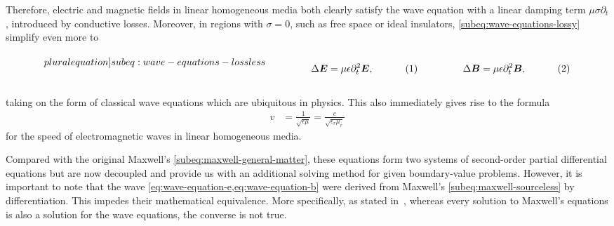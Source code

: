 \documentclass[11pt,a4paper,twoside,openany]{report}
\begin{document}
Therefore, electric and magnetic fields in linear homogeneous media both clearly satisfy the wave equation with a linear damping term $\mu\sigma\partial_t$, introduced by conductive losses. Moreover, in regions with $\sigma = 0$, such as free space or ideal insulators, \cref{subeq:wave-equations-lossy} simplify even more to\\
\begin{subequations}
    \label[pluralequation]{subeq:wave-equations-lossless}
    \noindent\centering
    \begin{minipage}{0.45\textwidth}
        \begin{align}
            \label{eq:wave-equation-e-lossless}
            \Delta\vec E &= \mu\epsilon\partial^2_t\vec E,
        \end{align}
    \end{minipage}
    \hfill
    \begin{minipage}{0.45\textwidth}
        \begin{align}
            \label{eq:wave-equations-b-lossless}
            \Delta\vec B &= \mu\epsilon\partial^2_t\vec B,
        \end{align}
    \end{minipage}\bigskip
\end{subequations}\\
taking on the form of classical wave equations which are ubiquitous in physics. This also immediately gives rise to the formula
\begin{align}
    v &= \frac{1}{\sqrt{\epsilon\mu}} = \frac{c}{\sqrt{\epsilon_r\mu_r}}
\end{align}
for the speed of electromagnetic waves in linear homogeneous media.

\begin{remark}
    \label{remark:nonequivalence-of-wave-equations-with-maxwells-equations}
    Compared with the original Maxwell's \cref{subeq:maxwell-general-matter}, these equations form two systems of second-order partial differential equations but are now decoupled and provide us with an additional solving method for given boundary-value problems. However, it is important to note that the wave \cref{eq:wave-equation-e,eq:wave-equation-b} were derived from Maxwell's \cref{subeq:maxwell-sourceless} by differentiation. This impedes their mathematical equivalence. More specifically, as stated in~\parencite{griffiths:introduction-to-electrodynamics}, whereas every solution to Maxwell's equations is also a solution for the wave equations, the converse is not true.
\end{remark}
\end{document}
